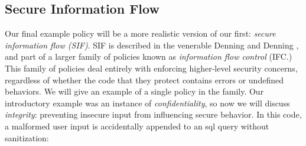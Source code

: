\documentclass{llncs}
\begin{document}





\subsection{Secure Information Flow}
\label{sec:SIF}

Our final example policy will be a more realistic version of our first:
{\em secure information flow (SIF)}. SIF is described in the venerable Denning and Denning
\cite{Denning77:SecureInformationFlow}, and part of a larger family of policies
known as {\em information flow control} (IFC.) This family of policies deal entirely with enforcing
higher-level security concerns, regardless of whether the code that they protect contains
errors or undefined behaviors. We will give an example of a single policy in the family.
Our introductory example was an instance of {\em confidentiality}, so now we will discuss
{\em integrity}: preventing insecure input from influencing secure behavior.
In this code, a malformed user input is accidentally appended to an sql query without sanitization:
\end{document}

